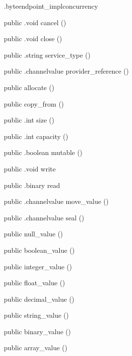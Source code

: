 \begin{CrexxClass}{.byteendpoint\_impl}{concurrency}
\begin{Members}
    \Method
      {public}
      {.void}
      {cancel}
      {()}

    \Method
      {public}
      {.void}
      {close}
      {()}

    \Method
      {public}
      {.string}
      {service\_type}
      {()}

    \Method
      {public}
      {.channelvalue}
      {provider\_reference}
      {()}

    \Factory
      {public}
      {allocate}
      {()}

    \Factory
      {public}
      {copy\_from}
      {()}

    \Method
      {public}
      {.int}
      {size}
      {()}

    \Method
      {public}
      {.int}
      {capacity}
      {()}

    \Method
      {public}
      {.boolean}
      {mutable}
      {()}

    \Method
      {public}
      {.void}
      {write}
      {}

    \Method
      {public}
      {.binary}
      {read}
      {}

    \Method
      {public}
      {.channelvalue}
      {move\_value}
      {()}

    \Method
      {public}
      {.channelvalue}
      {seal}
      {()}

    \Factory
      {public}
      {null\_value}
      {()}

    \Factory
      {public}
      {boolean\_value}
      {()}

    \Factory
      {public}
      {integer\_value}
      {()}

    \Factory
      {public}
      {float\_value}
      {()}

    \Factory
      {public}
      {decimal\_value}
      {()}

    \Factory
      {public}
      {string\_value}
      {()}

    \Factory
      {public}
      {binary\_value}
      {()}

    \Factory
      {public}
      {array\_value}
      {()}


\end{Members}
\end{CrexxClass}
